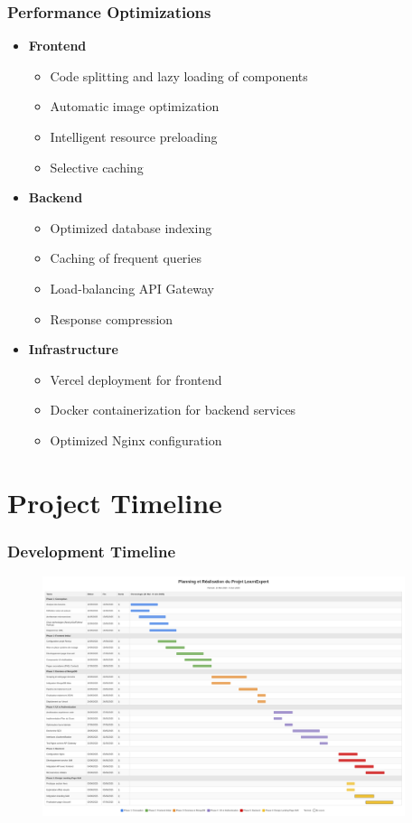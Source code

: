 \documentclass{beamer}
\begin{document}
\begin{frame}
\frametitle{Performance Optimizations}
\begin{itemize}
    \item \textbf{Frontend}
    \begin{itemize}
        \item Code splitting and lazy loading of components
        \item Automatic image optimization
        \item Intelligent resource preloading
        \item Selective caching
    \end{itemize}
    \item \textbf{Backend}
    \begin{itemize}
        \item Optimized database indexing
        \item Caching of frequent queries
        \item Load-balancing API Gateway
        \item Response compression
    \end{itemize}
    \item \textbf{Infrastructure}
    \begin{itemize}
        \item Vercel deployment for frontend
        \item Docker containerization for backend services
        \item Optimized Nginx configuration
    \end{itemize}
\end{itemize}
\end{frame}

\section{Project Timeline}

\begin{frame}
\frametitle{Development Timeline}
\begin{center}
    \includegraphics[width=0.95\textwidth,height=7cm,keepaspectratio]{Screenshot 2025-06-08 at 20-35-06 Planning du Projet LearnExpert - Diagramme de Gantt.png}
\end{center}
\end{frame}
\end{document}
